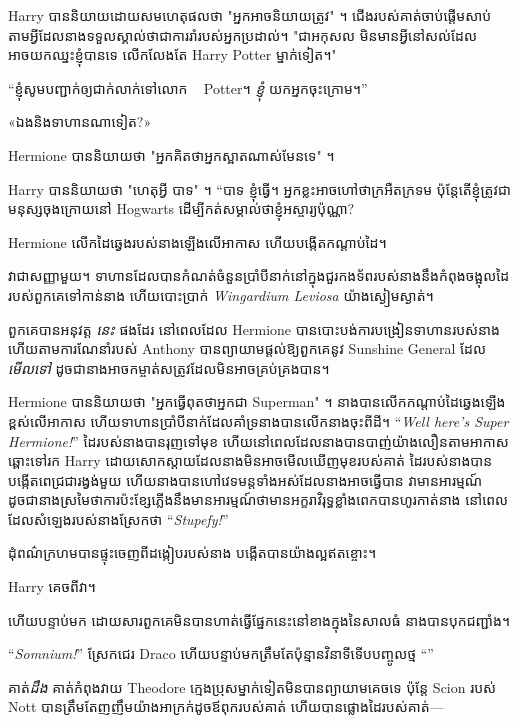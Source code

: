 {Harry បាននិយាយដោយសមហេតុផលថា "អ្នកអាចនិយាយត្រូវ" ។ ជើង​របស់​គាត់​ចាប់​ផ្ដើម​សាប់​តាម​អ្វី​ដែល​នាង​ទទួល​ស្គាល់​ថា​ជា​ការ​រាំ​របស់​អ្នក​ប្រដាល់។ "ជាអកុសល មិនមានអ្វីនៅសល់ដែលអាចយកឈ្នះខ្ញុំបានទេ លើកលែងតែ Harry Potter ម្នាក់ទៀត។"

“ខ្ញុំ​សូម​បញ្ជាក់​ឲ្យ​ជាក់លាក់​ទៅ​លោក ~ Potter។ \emph{ខ្ញុំ} យកអ្នកចុះក្រោម។”

«ឯង​និង​ទាហាន​ណា​ទៀត?»

Hermione បាននិយាយថា "អ្នកគិតថាអ្នកស្អាតណាស់មែនទេ" ។

Harry បាននិយាយថា "ហេតុអ្វី បាទ" ។ “បាទ ខ្ញុំធ្វើ។ អ្នក​ខ្លះ​អាច​ហៅ​ថា​ក្រអឺតក្រទម ប៉ុន្តែ​តើ​ខ្ញុំ​ត្រូវ​ជា​មនុស្ស​ចុង​ក្រោយ​នៅ Hogwarts ដើម្បី​កត់​សម្គាល់​ថា​ខ្ញុំ​អស្ចារ្យ​ប៉ុណ្ណា?

Hermione លើកដៃឆ្វេងរបស់នាងឡើងលើអាកាស ហើយបង្កើតកណ្តាប់ដៃ។

វាជាសញ្ញាមួយ។ ទាហានដែលបានកំណត់ចំនួនប្រាំបីនាក់នៅក្នុងជួរកងទ័ពរបស់នាងនឹងកំពុងចង្អុលដៃរបស់ពួកគេទៅកាន់នាង ហើយបោះប្រាក់ \emph{Wingardium Leviosa} យ៉ាងស្ងៀមស្ងាត់។

ពួកគេបានអនុវត្ត \emph{នេះ} ផងដែរ នៅពេលដែល Hermione បានបោះបង់ការបង្រៀនទាហានរបស់នាង ហើយតាមការណែនាំរបស់ Anthony បានព្យាយាមផ្តល់ឱ្យពួកគេនូវ Sunshine General ដែល \emph{មើលទៅ} ដូចជានាងអាចកម្ចាត់សត្រូវដែលមិនអាចគ្រប់គ្រងបាន។

Hermione បាននិយាយថា "អ្នកធ្វើពុតថាអ្នកជា Superman" ។ នាង​បាន​លើក​កណ្តាប់ដៃ​ឆ្វេង​ឡើង​ខ្ពស់​លើ​អាកាស ហើយ​ទាហាន​ប្រាំបី​នាក់​ដែល​គាំទ្រ​នាង​បាន​លើក​នាង​ចុះ​ពី​ដី។ “\emph{Well here's Super Hermione!}” ដៃរបស់នាងបានរុញទៅមុខ ហើយនៅពេលដែលនាងបានបាញ់យ៉ាងលឿនតាមអាកាសឆ្ពោះទៅរក Harry ដោយសោកស្តាយដែលនាងមិនអាចមើលឃើញមុខរបស់គាត់ ដៃរបស់នាងបានបង្កើតពេជ្រជារង្វង់មួយ ហើយនាងបានហៅវេទមន្តទាំងអស់ដែលនាងអាចធ្វើបាន វាមានអារម្មណ៍ដូចជានាងស្រមៃថាការប៉ះខ្សែភ្លើងនឹងមានអារម្មណ៍ថាមានអក្ខរាវិរុទ្ធខ្លាំងពេកបានហូរកាត់នាង នៅពេលដែលសំឡេងរបស់នាងស្រែកថា “\emph{Stupefy!}”

ដុំ​ពណ៌​ក្រហម​បាន​ផ្ទុះ​ចេញ​ពី​ដង្កៀប​របស់​នាង បង្កើត​បាន​យ៉ាង​ល្អ​ឥត​ខ្ចោះ។

Harry គេចពីវា។

ហើយ​បន្ទាប់​មក ដោយ​សារ​ពួក​គេ​មិន​បាន​ហាត់​ធ្វើ​ផ្នែក​នេះ​នៅ​ខាង​ក្នុង​នៃ​សាល​ធំ នាង​បាន​បុក​ជញ្ជាំង។

\later

“\emph{Somnium!}” ស្រែក​ជេរ​ Draco ហើយ​បន្ទាប់​មក​ត្រឹម​តែ​ប៉ុន្មាន​វិនាទី​ទើប​បញ្ចូល​ថ្ម “”

គាត់\emph{ដឹង} គាត់កំពុងវាយ Theodore ក្មេងប្រុសម្នាក់ទៀតមិនបានព្យាយាមគេចទេ ប៉ុន្តែ Scion របស់ Nott បានត្រឹមតែញញឹមយ៉ាងអាក្រក់ដូចឪពុករបស់គាត់ ហើយបានផ្លោងដៃរបស់គាត់—

}
